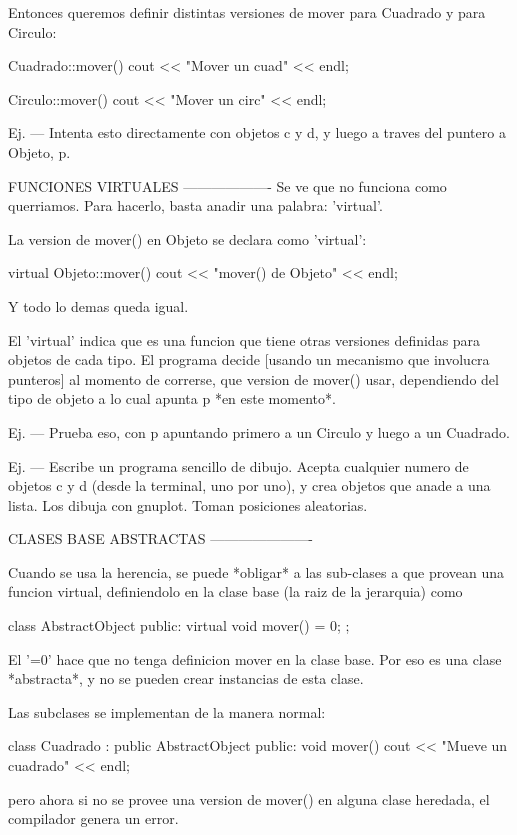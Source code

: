 Entonces queremos definir distintas versiones de mover para Cuadrado y para Circulo:

Cuadrado::mover() {
	cout << "Mover un cuad" << endl;
}

Circulo::mover() {
	cout << "Mover un circ" << endl;
}


Ej.
---
Intenta esto directamente con objetos c y d, y luego a traves del puntero a Objeto, p.


FUNCIONES VIRTUALES
-------------------
Se ve que no funciona como querriamos.
Para hacerlo, basta anadir una palabra: 'virtual'.

La version de mover() en Objeto se declara como 'virtual':

virtual Objeto::mover() {
	cout << "mover() de Objeto" << endl;
}

Y todo lo demas queda igual.

El 'virtual' indica que es una funcion que tiene otras versiones definidas para objetos de cada tipo.
El programa decide [usando un mecanismo que involucra punteros] al momento de correrse, que version de mover() usar, dependiendo del tipo de objeto a lo cual apunta p *en este momento*.

Ej.
---
Prueba eso, con p apuntando primero a un Circulo y luego a un Cuadrado.

Ej.
---
Escribe un programa sencillo de dibujo.
Acepta cualquier numero de objetos c y d (desde la terminal, uno por uno), y crea objetos que anade a una lista. Los dibuja con gnuplot.
Toman posiciones aleatorias.





CLASES BASE ABSTRACTAS
----------------------

Cuando se usa la herencia, se puede *obligar* a las sub-clases a que provean una funcion virtual, definiendolo en la clase base (la raiz de la jerarquia) como

class AbstractObject {
	public:
		virtual void mover() = 0;
};

El '=0' hace que no tenga definicion mover en la clase base. Por eso es una clase *abstracta*, y no se pueden crear instancias de esta clase.

Las subclases se implementan de la manera normal:

class Cuadrado : public AbstractObject {
	public:
		void mover() {
		 cout << "Mueve un cuadrado" << endl;	
}
}

pero ahora si no se provee una version de mover() en alguna clase heredada, el compilador genera un error.




